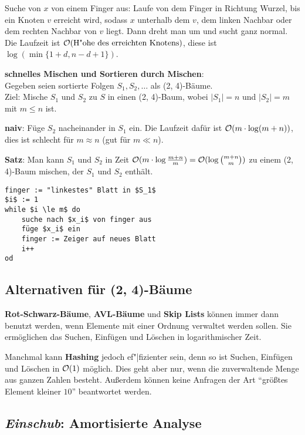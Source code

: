 Suche von $x$ von einem Finger aus:
Laufe von dem Finger in Richtung Wurzel, bis ein Knoten $v$ erreicht wird,
sodass $x$ unterhalb dem $v$, dem linken Nachbar oder dem rechten Nachbar
von $v$ liegt.
Dann dreht man um und sucht ganz normal. \\
Die Laufzeit ist $\mathcal{O}(\text{H"ohe des erreichten Knotens})$,
diese ist $\log(\min\{1 + d, n - d + 1\})$.

\linie

\textbf{schnelles Mischen und Sortieren durch Mischen}: \\
Gegeben seien sortierte Folgen $S_1, S_2, \dotsc$ als (2, 4)-Bäume. \\
Ziel: Mische $S_1$ und $S_2$ zu $S$ in einen (2, 4)-Baum,
wobei $|S_1| = n$ und $|S_2| = m$ mit $m \le n$ ist.

\textbf{naiv}:
Füge $S_2$ nacheinander in $S_1$ ein.
Die Laufzeit dafür ist $\mathcal{O}(m \cdot \log(m + n))$, dies ist schlecht für
$m \approx n$ (gut für $m \ll n$).

\textbf{Satz}:
Man kann $S_1$ und $S_2$ in Zeit
$\mathcal{O}(m \cdot \log \frac{m + n}{m}) = \mathcal{O}(\log \binom{m + n}{m})$ zu einem
(2, 4)-Baum mischen, der $S_1$ und $S_2$ enthält.

\begin{lstlisting}
finger := "linkestes" Blatt in $S_1$
$i$ := 1
while $i \le m$ do
    suche nach $x_i$ von finger aus
    füge $x_i$ ein
    finger := Zeiger auf neues Blatt
    i++
od
\end{lstlisting}

\pagebreak

\subsection{%
    Alternativen für (2, 4)-Bäume%
}

\textbf{Rot-Schwarz-Bäume}, \textbf{AVL-Bäume} und \textbf{Skip Lists}
können immer dann benutzt werden, wenn Elemente mit einer Ordnung verwaltet
werden sollen.
Sie ermöglichen das Suchen, Einfügen und Löschen in logarithmischer Zeit.

Manchmal kann \textbf{Hashing} jedoch ef"|fizienter sein, denn so ist
Suchen, Einfügen und Löschen in $\mathcal{O}(1)$ möglich.
Dies geht aber nur, wenn die zuverwaltende Menge aus ganzen Zahlen besteht.
Außerdem können keine Anfragen der Art "`größtes Element kleiner $10$"'
beantwortet werden.

\subsection{%
    \emph{Einschub}: Amortisierte Analyse%
}

